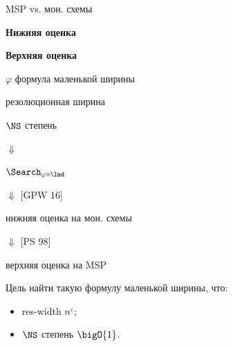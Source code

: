 \begin{frame}{MSP vs. мон. схемы}

    \begin{minipage}{0.5 \textwidth}
        \centering
        \textbf{Нижняя оценка}
    \end{minipage}%
    \begin{minipage}{0.5 \textwidth}
        \centering
        \textbf{Верхняя оценка}
    \end{minipage}
    
    \begin{center}
        $\varphi$ формула маленькой ширины
	\end{center}


    \vspace{0.4cm}

    \begin{minipage}{0.5 \textwidth}
        \centering
        резолюционная ширина
    \end{minipage}%
    \begin{minipage}{0.5 \textwidth}
        \centering
        $\NS$ степень
    \end{minipage}

    \vspace{0.3cm}
    \begin{center}
        $\Downarrow$
        
        \vspace{0.3cm}
        $\Search_{\varphi \circ \Ind}$
    \end{center}
 
    \vspace{0.3cm}
    \begin{minipage}{0.5 \textwidth}
        \centering
        $\Downarrow$ [GPW 16]

        \vspace{0.3cm}

        нижняя оценка на мон. схемы
    \end{minipage}%
    \begin{minipage}{0.5 \textwidth}
        \centering
        $\Downarrow$ [PS 98]

        \vspace{0.3cm}

        верхняя оценка на MSP
    \end{minipage}


    \vspace{1cm}
    Цель найти такую формулу маленькой ширины, что:
    \begin{itemize}
        \item res-width $n^{\varepsilon}$;
        \item $\NS$ степень $\bigO{1}$.
    \end{itemize}
\end{frame}

